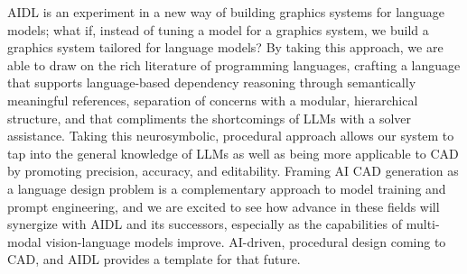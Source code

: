 AIDL is an experiment in a new way of building graphics systems for language models; what if, instead of tuning a model for a graphics system, we build a graphics system tailored for language models? By taking this approach, we are able to draw on the rich literature of programming languages, crafting a language that supports language-based dependency reasoning through semantically meaningful references, separation of concerns with a modular, hierarchical structure, and that compliments the shortcomings of LLMs with a solver assistance. Taking this neurosymbolic, procedural approach allows our system to tap into the general knowledge of LLMs as well as being more applicable to CAD by promoting precision, accuracy, and editability. Framing AI CAD generation as a language design problem is a complementary approach to model training and prompt engineering, and we are excited to see how advance in these fields will synergize with AIDL and its successors, especially as the capabilities of multi-modal vision-language models improve. AI-driven, procedural design coming to CAD, and AIDL provides a template for that future.







